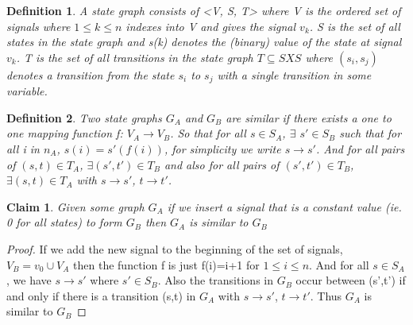 \documentclass{article}
\newtheorem*{definition}{Definition}
\newtheorem*{claim}{Claim}
\begin{document}
\begin{definition}A state graph consists of <V, S, T> where V is the ordered set of signals where $1\leq k \leq n$ indexes into V and gives the signal $v_k$.  S is the set of all states in the state graph
and s(k) denotes the (binary) value of the state at signal $v_k$.  T is the set of all transitions in the state graph $T \subseteq S X S$ where $(s_i, s_j)$ denotes a transition from the state $s_i$ to $s_j$ 
with a single transition in some variable.\end{definition}
\begin{definition}Two state graphs $G_A$ and $G_B$ are similar if there exists a one to one mapping function f: $V_A \to V_B$.  So that for all $s \in S_A$, $\exists$ $s' \in S_B$ such that for all i in $n_A$,
$s(i)=s'(f(i))$, for simplicity we write $s\to s'$. And for all pairs of $(s,t) \in T_A$, $\exists (s',t') \in T_B$ and also for all pairs of $(s',t') \in T_B$, $\exists (s,t) \in T_A$ with $s\to s'$, $t\to t'$.\end{definition}

\begin{claim}Given some graph $G_A$ if we insert a signal that is a constant value (ie. 0 for all states) to form $G_B$ then $G_A$ is similar to $G_B$  \end{claim}
\begin{proof}
If we add the new signal to the beginning of the set of signals, $V_B={v_0} \cup V_A$ then the function f is just f(i)=i+1 for $1\leq i \leq n$.  And for all $s \in S_A$, we have $s\to s'$ where $s' \in S_B$.
Also the transitions in $G_B$ occur between (s',t') if and only if there is a transition (s,t) in $G_A$ with $s\to s'$, $t\to t'$.  Thus $G_A$ is similar to $G_B$
\end{proof}
\end{document}
